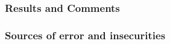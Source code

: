 \subsubsection*{Results and Comments}

%
%
%
%
%
%
\subsubsection*{Sources of error and insecurities}
